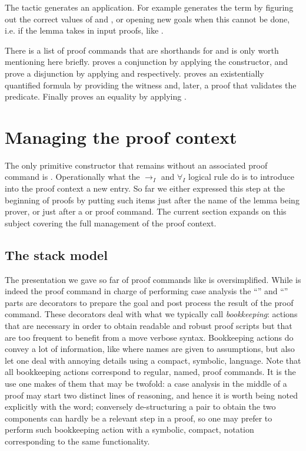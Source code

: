 The  tactic generates an application.  For example 
generates the term  by figuring out the correct values of
 and , or opening new goals when this cannot be done, i.e.
if the lemma takes in input proofs, like .

There is a list of proof commands that are shorthands for 
and is only worth mentioning here briefly.  proves a conjunction
by applying the  constructor,  and  prove a
disjunction by applying  and  respectively.
 proves an existentially quantified formula by providing
the witness  and, later, a proof that  validates the predicate.
Finally  proves an equality by applying .

\section{Managing the proof context}
The only primitive constructor that remains without an associated proof command
is .  Operationally what the $\to_I$ and
$\forall_I$ logical rule do is to introduce into the proof context a
new entry.  So far we either expressed this step at the beginning of proofs
by putting such items just after the name of the lemma being prover, or
just after a  or  proof command.  The current section
expands on this subject covering the full management of the proof context.

\subsection{The stack model}

The presentation we gave so far of proof commands like 
is oversimplified.  While  is indeed the proof command in
charge of performing case analysis the ``'' and ``\C{=> [|m]}''
parts are decorators to prepare the goal and post process the result of
the proof command.  These decorators deal with what we typically call
\emph{bookkeeping}: actions that are necessary in order to obtain readable and
robust proof scripts but that are too frequent to benefit from a move verbose
syntax.  Bookkeeping actions do convey a lot of information, like where
names are given to assumptions, but also let one deal with annoying details
using a compact, symbolic, language.  Note that all bookkeeping actions
correspond to regular, named, proof commands.  It is the use one makes of them
that may be twofold: a case analysis in the middle of a proof may start two
distinct lines of reasoning, and hence it is worth being noted explicitly with
the  word; conversely de-structuring a pair to obtain the two
components can hardly be a relevant step in a proof, so one may prefer to
perform such bookkeeping action with a symbolic, compact, notation
corresponding to the same  functionality.

